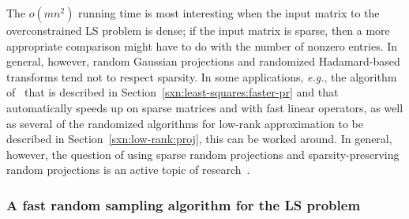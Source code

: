 \documentclass[twoside]{article}
\begin{document}
The $o(mn^2)$ running time is most interesting when the input matrix to 
the overconstrained LS problem is dense; if the input matrix is sparse, then 
a more appropriate comparison might have to do with the number of nonzero 
entries.
In general, however, random Gaussian projections and randomized
Hadamard-based transforms tend not to respect sparsity.
In some applications, \emph{e.g.}, the algorithm of~\cite{MSM11_TR} that 
is described in Section~\ref{sxn:least-squares:faster-pr} and that 
automatically speeds up on sparse matrices and with fast linear operators, 
as well as several of the randomized algorithms for low-rank approximation 
to be described in Section~\ref{sxn:low-rank:proj}, this can be worked around.
In general, however, the question of using sparse random projections and 
sparsity-preserving random projections is an active topic of 
research~\cite{DKT10,KN10_TR,KN10b_TR,GI10}.


\subsubsection{A fast random sampling algorithm for the LS problem}
\label{sxn:least-squares:faster-th:rand-samp}
\end{document}
